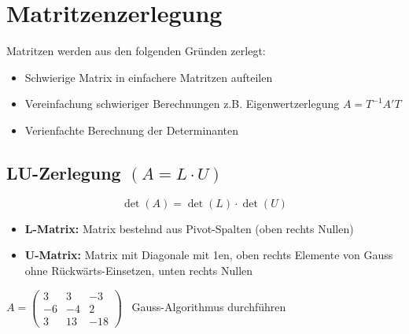 \section{Matritzenzerlegung}

Matritzen werden aus den folgenden Gründen zerlegt: 
\vspace{0.1cm}

\begin{itemize}
	\item Schwierige Matrix in einfachere Matritzen aufteilen
	\item Vereinfachung schwieriger Berechnungen z.B. Eigenwertzerlegung $A = T^{-1} A' T$
	\item Verienfachte Berechnung der Determinanten 
\end{itemize}
	

\subsection[LU-Zerlegung]{LU-Zerlegung $(A = L \cdot U)$}

\vspace{-0.2cm}
$$ \det(A) =  \det(L) \cdot \det(U)$$  

\begin{itemize}
	\item \textbf{$\bm{L}$-Matrix:} Matrix bestehnd aus Pivot-Spalten (oben rechts Nullen)
	\item \textbf{$\bm{U}$-Matrix:} Matrix mit Diagonale mit 1en, oben rechts Elemente von Gauss ohne Rückwärts-Einsetzen, 
		unten rechts Nullen 	
\end{itemize}		


		
$A = \begin{pmatrix}
	3  & 3  & -3 \\
	-6 & -4 & 2  \\
	3  & 13 & -18 \end{pmatrix}$ 
	\qquad \textrightarrow\ Gauss-Algorithmus durchführen
\vspace{0.3cm}
		
